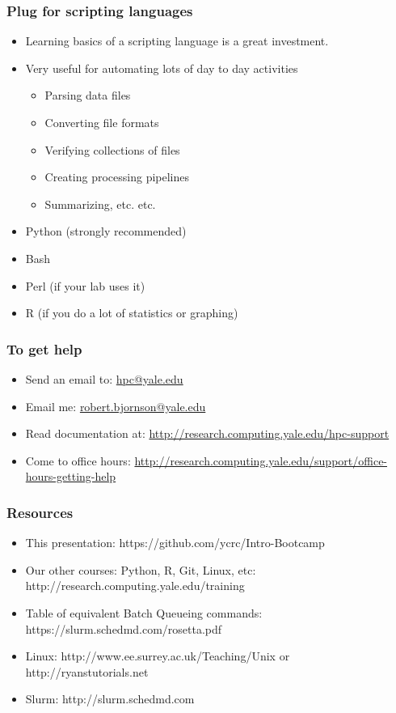 \documentclass[10pt]{beamer}
\begin{document}
\begin{frame}[fragile]
\frametitle{Plug for scripting languages}

\begin{itemize}
\item Learning basics of a scripting language is a great investment.
\item Very useful for automating lots of day to day activities
\begin{itemize}
\item Parsing data files
\item Converting file formats
\item Verifying collections of files
\item Creating processing pipelines
\item Summarizing, etc. etc.
\end{itemize}
\item Python (strongly recommended)
\item Bash 
\item Perl (if your lab uses it)
\item R (if you do a lot of statistics or graphing)
\end{itemize}

\end{frame}

\begin{frame}
\frametitle{To get help}
\begin{itemize}
\item Send an email to: \url{hpc@yale.edu}
\item Email me: \url{robert.bjornson@yale.edu}
\item Read documentation at: \url{http://research.computing.yale.edu/hpc-support}
\item Come to office hours: \url{http://research.computing.yale.edu/support/office-hours-getting-help}
\end{itemize}
\end{frame}

\begin{frame}[fragile]
\frametitle{Resources}

\begin{itemize}
\item This presentation: https://github.com/ycrc/Intro-Bootcamp
\item Our other courses: Python, R, Git, Linux, etc: http://research.computing.yale.edu/training
\item Table of equivalent Batch Queueing commands: https://slurm.schedmd.com/rosetta.pdf
\item Linux: http://www.ee.surrey.ac.uk/Teaching/Unix or http://ryanstutorials.net
\item Slurm: http://slurm.schedmd.com
\end{itemize}

\end{frame}
\end{document}
